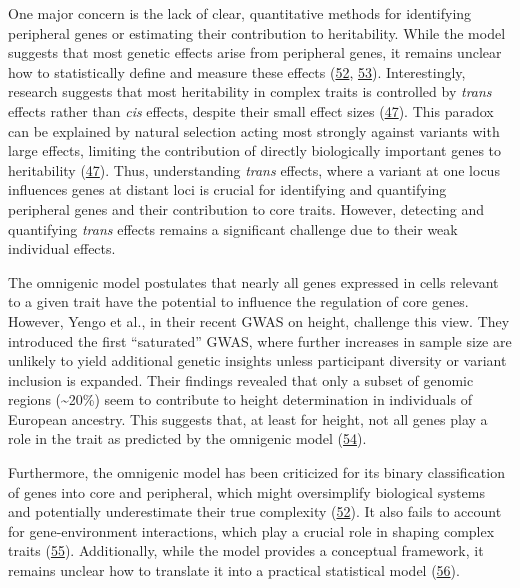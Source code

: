 One major concern is the lack of clear, quantitative methods for identifying peripheral genes or estimating their contribution to heritability.
While the model suggests that most genetic effects arise from peripheral genes, it remains unclear how to statistically define and measure these effects (\protect\hyperlink{ref-82fs3SZo}{52}, \protect\hyperlink{ref-javtAG7r}{53}).
Interestingly, research suggests that most heritability in complex traits is controlled by \emph{trans} effects rather than \emph{cis} effects, despite their small effect sizes (\protect\hyperlink{ref-LXvTZzEA}{47}).
This paradox can be explained by natural selection acting most strongly against variants with large effects, limiting the contribution of directly biologically important genes to heritability (\protect\hyperlink{ref-LXvTZzEA}{47}).
Thus, understanding \emph{trans} effects, where a variant at one locus influences genes at distant loci is crucial for identifying and quantifying peripheral genes and their contribution to core traits.
However, detecting and quantifying \emph{trans} effects remains a significant challenge due to their weak individual effects.

The omnigenic model postulates that nearly all genes expressed in cells relevant to a given trait have the potential to influence the regulation of core genes.
However, Yengo et al., in their recent GWAS on height, challenge this view.
They introduced the first ``saturated'' GWAS, where further increases in sample size are unlikely to yield additional genetic insights unless participant diversity or variant inclusion is expanded.
Their findings revealed that only a subset of genomic regions (\textasciitilde20\%) seem to contribute to height determination in individuals of European ancestry.
This suggests that, at least for height, not all genes play a role in the trait as predicted by the omnigenic model (\protect\hyperlink{ref-HFRaLwGQ}{54}).

Furthermore, the omnigenic model has been criticized for its binary classification of genes into core and peripheral, which might oversimplify biological systems and potentially underestimate their true complexity (\protect\hyperlink{ref-82fs3SZo}{52}).
It also fails to account for gene-environment interactions, which play a crucial role in shaping complex traits (\protect\hyperlink{ref-dg9nKuy0}{55}).
Additionally, while the model provides a conceptual framework, it remains unclear how to translate it into a practical statistical model (\protect\hyperlink{ref-1GlQtJ9Yz}{56}).

